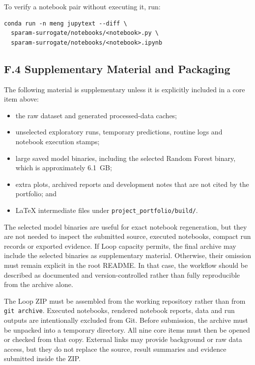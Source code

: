 To verify a notebook pair without executing it, run:

\begin{verbatim}
conda run -n meng jupytext --diff \
  sparam-surrogate/notebooks/<notebook>.py \
  sparam-surrogate/notebooks/<notebook>.ipynb
\end{verbatim}

\clearpage
\PortfolioContentPageCommand
{}
{}
\subsection*{F.4 Supplementary Material and Packaging}
\label{app:f-supplementary}

The following material is supplementary unless it is explicitly included in a
core item above:

\begin{itemize}
    \item the raw dataset and generated processed-data caches;
    \item unselected exploratory runs, temporary predictions, routine logs and
          notebook execution stamps;
    \item large saved model binaries, including the selected Random Forest
          binary, which is approximately 6.1~GB;
    \item extra plots, archived reports and development notes that are not
          cited by the portfolio; and
    \item LaTeX intermediate files under \nolinkurl{project_portfolio/build/}.
\end{itemize}

The selected model binaries are useful for exact notebook regeneration, but
they are not needed to inspect the submitted source, executed notebooks,
compact run records or exported evidence. If Loop capacity permits, the final
archive may include the selected binaries as supplementary material. Otherwise,
their omission must remain explicit in the root README. In that case, the
workflow should be described as documented and version-controlled rather than
fully reproducible from the archive alone.

The Loop ZIP must be assembled from the working repository rather than from
\texttt{git archive}. Executed notebooks, rendered notebook reports, data and
run outputs are intentionally excluded from Git. Before submission, the archive
must be unpacked into a temporary directory. All nine core items must then be
opened or checked from that copy. External links may provide background or raw
data access, but they do not replace the source, result summaries and evidence
submitted inside the ZIP.

